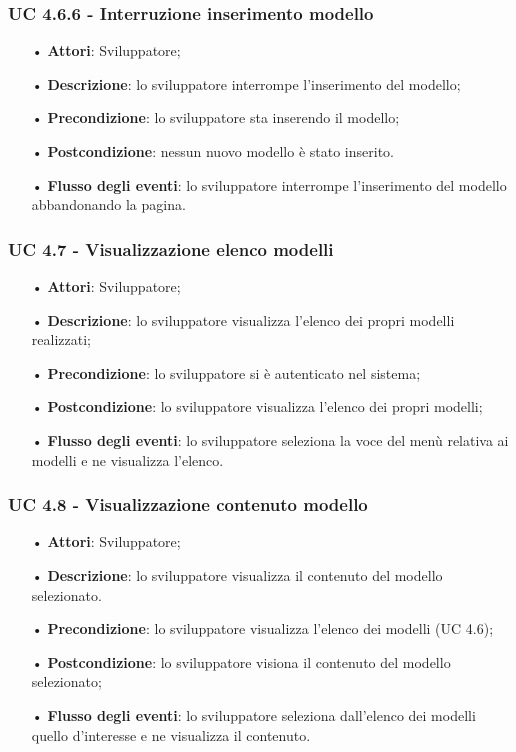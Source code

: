 \subsubsection{UC 4.6.6 - Interruzione inserimento modello}
\begin{itemize}
	\item[•]\textbf{Attori}: Sviluppatore;
	\item[•]\textbf{Descrizione}: lo sviluppatore interrompe l'inserimento del modello;
	\item[•]\textbf{Precondizione}: lo sviluppatore sta inserendo il modello;
	\item[•]\textbf{Postcondizione}: nessun nuovo modello è stato inserito.
	\item[•]\textbf{Flusso degli eventi}: lo sviluppatore interrompe l'inserimento del modello abbandonando la pagina.
\end{itemize}
\subsubsection{UC 4.7 - Visualizzazione elenco modelli}
\begin{itemize}
	\item[•]\textbf{Attori}: Sviluppatore;
	\item[•]\textbf{Descrizione}: lo sviluppatore visualizza l'elenco dei propri modelli realizzati;
	\item[•]\textbf{Precondizione}: lo sviluppatore si è autenticato nel sistema;
	\item[•]\textbf{Postcondizione}: lo sviluppatore visualizza l'elenco dei propri modelli;
	\item[•]\textbf{Flusso degli eventi}:  lo sviluppatore seleziona la voce del menù relativa ai modelli e ne visualizza l'elenco.
\end{itemize}


\subsubsection{UC 4.8 - Visualizzazione contenuto modello} 
\begin{itemize}
	\item[•]\textbf{Attori}: Sviluppatore;
	\item[•]\textbf{Descrizione}: lo sviluppatore visualizza il contenuto del modello selezionato.
	\item[•]\textbf{Precondizione}: lo sviluppatore visualizza l'elenco dei modelli (UC 4.6);
	\item[•]\textbf{Postcondizione}: lo sviluppatore visiona il contenuto del modello selezionato;
	\item[•]\textbf{Flusso degli eventi}: lo sviluppatore seleziona dall'elenco dei modelli quello d'interesse e ne visualizza il contenuto.
\end{itemize}

